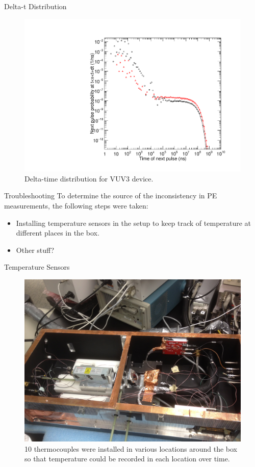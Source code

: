 \documentclass{beamer}
\begin{document}
\begin{frame}{Delta-t Distribution}
\begin{figure}
\centering
\includegraphics[height=0.5\textwidth]{DTVUV3.pdf}
\caption{Delta-time distribution for VUV3 device.}
\end{figure}
\end{frame}

\begin{frame}{Troubleshooting}
To determine the source of the inconsistency in PE measurements, the following steps were taken:\\
\begin{itemize}
\item Installing temperature sensors in the setup to keep track of temperature at different places in the box.
\item Other stuff?
\end{itemize}
\end{frame}

\begin{frame}{Temperature Sensors}
\begin{figure}
\centering
\includegraphics[height=0.5\textwidth]{sensors.JPG}
\caption{10 thermocouples were installed in various locations around the box so that temperature could be recorded in each location over time.}
\end{figure}
\end{frame}
\end{document}
